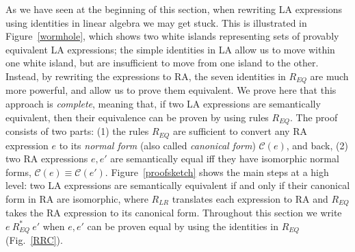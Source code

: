 As we have seen at the beginning of this section, when rewriting LA
expressions using identities in linear algebra we may get stuck.  This
is illustrated in Figure~\ref{wormhole}, which shows two white islands
representing sets of provably equivalent LA expressions; the simple
identities in LA allow us to move within one white island, but are
insufficient to move from one island to the other.  Instead, by
rewriting the expressions to RA, the seven identities in $R_{EQ}$ are
much more powerful, and allow us to prove them equivalent.  We prove
here that this approach is {\em complete}, meaning that, if two LA
expressions are semantically equivalent, then their equivalence can be
proven by using rules $R_{EQ}$.  The proof consists of two parts: (1)
the rules $R_{EQ}$ are sufficient to convert any RA expression $e$ to
its {\em normal form} (also called {\em canonical form})
$\mathcal{C}(e)$, and back, (2) two RA expressions $e, e'$ are
semantically equal iff they have isomorphic normal forms,
$\mathcal{C}(e) \equiv \mathcal{C}(e')$.
% 
% 
% 
% 
Figure~\ref{proofsketch} shows the main steps at a high level: two LA
expressions are semantically equivalent if and only if their canonical
form in RA are isomorphic, where $R_{LR}$ translates each expression
to RA and $R_{EQ}$ takes the RA expression to its canonical form.
Throughout this section we write $e\ R_{EQ}^*\ e'$ when $e, e'$ can be
proven equal by using the identities in $R_{EQ}$ (Fig.~\ref{RRC}).



